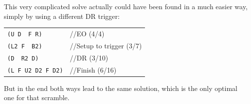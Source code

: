 \documentclass[11pt,a4paper]{book}
\newcommand{\p}{\textquotesingle}
\newcommand{\m}{\texttt}
\newcommand{\ps}{\p\,\,}
\newcommand{\comment}[1]{{\color{gray}\quad//#1}}
\begin{document}
This very complicated solve actually could have been found in a much easier way, simply by using a different DR trigger:

\begin{center}
\begin{tabular}{ll}
\m{(U D\ps F R)} & \comment{EO (4/4)}\\
\m{(L2 F\ps B2)} & \comment{Setup to trigger (3/7)}\\
\m{(D\ps R2 D\p)} & \comment{DR (3/10)}\\
\m{(L F U2 D2 F D2)} & \comment{Finish (6/16)}\\
\end{tabular}
\end{center}


But in the end both ways lead to the same solution, which is the only optimal one for that scramble.
\end{document}
